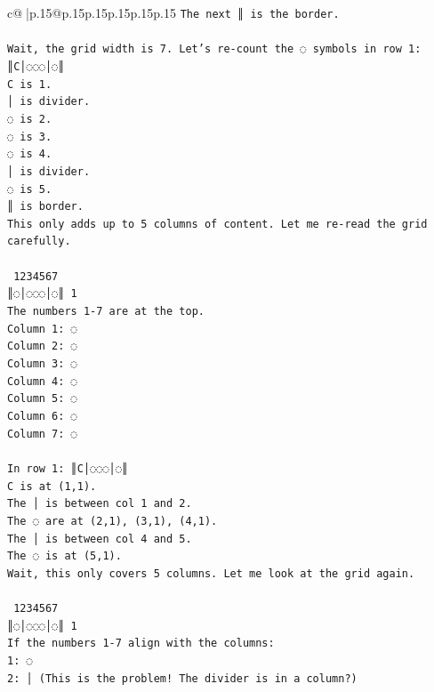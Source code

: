 \documentclass{article}
\begin{document}
{\begin{supertabular}{c@{$\;$}|p{.15\linewidth}@{}p{.15\linewidth}p{.15\linewidth}p{.15\linewidth}p{.15\linewidth}p{.15\linewidth}}
{{{\texttt{The next ║ is the border.} \\
\\ 
\texttt{Wait, the grid width is 7. Let's re{-}count the ◌ symbols in row 1:} \\
\texttt{║C│◌◌◌│◌║} \\
\texttt{C is 1.} \\
\texttt{│ is divider.} \\
\texttt{◌ is 2.} \\
\texttt{◌ is 3.} \\
\texttt{◌ is 4.} \\
\texttt{│ is divider.} \\
\texttt{◌ is 5.} \\
\texttt{║ is border.} \\
\texttt{This only adds up to 5 columns of content. Let me re{-}read the grid carefully.} \\
\\ 
\texttt{ 1234567} \\
\texttt{║◌│◌◌◌│◌║ 1} \\
\texttt{The numbers 1{-}7 are at the top.} \\
\texttt{Column 1: ◌} \\
\texttt{Column 2: ◌} \\
\texttt{Column 3: ◌} \\
\texttt{Column 4: ◌} \\
\texttt{Column 5: ◌} \\
\texttt{Column 6: ◌} \\
\texttt{Column 7: ◌} \\
\\ 
\texttt{In row 1: ║C│◌◌◌│◌║} \\
\texttt{C is at (1,1).} \\
\texttt{The │ is between col 1 and 2.} \\
\texttt{The ◌ are at (2,1), (3,1), (4,1).} \\
\texttt{The │ is between col 4 and 5.} \\
\texttt{The ◌ is at (5,1).} \\
\texttt{Wait, this only covers 5 columns. Let me look at the grid again.} \\
\\ 
\texttt{ 1234567} \\
\texttt{║◌│◌◌◌│◌║ 1} \\
\texttt{If the numbers 1{-}7 align with the columns:} \\
\texttt{1: ◌} \\
\texttt{2: │ (This is the problem! The divider is in a column?)} \\
}}}
\end{supertabular}}
\end{document}
